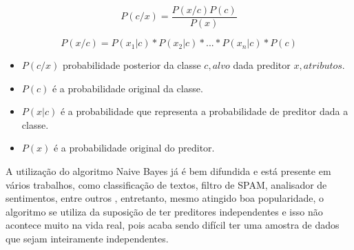 \begin{equation}
 P(c/x)= \frac{P(x/c)P(c)}{P(x)}
\label{eq:bayes}
 \end{equation}

\begin{equation}
 P(x/c)=P(x_1|c)*P(x_2|c)*...*P(x_n|c)*P(c)
 \label{eq:bayes:numerador}
\end{equation}


\begin{itemize}[noitemsep]
 \item ${P(c/x)}$ probabilidade posterior da classe ${c,alvo}$ dada preditor ${x,atributos}$.
 \item ${P(c)}$  é a probabilidade original da classe.
 \item ${P(x|c)}$  é a probabilidade que representa a probabilidade de preditor dada a classe.
 \item ${P(x)}$  é a probabilidade original do preditor.
\end{itemize}

A utilização do algoritmo Naive Bayes já é bem difundida e está presente em vários trabalhos, como classificação de textos, filtro de SPAM, analisador de sentimentos, entre outros \cite{Madureira2017, Lucca2013, Wu2008, Mccallum1997}, entretanto, mesmo atingido boa popularidade, o algoritmo se utiliza da suposição de ter preditores independentes e isso não acontece muito na vida real, pois acaba sendo difícil ter uma amostra de dados que sejam inteiramente independentes. 


